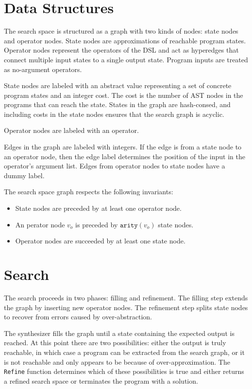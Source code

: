 \documentclass{article}
\begin{document}
\section{Data Structures}

The search space is structured as a graph with two kinds of nodes: state nodes
and operator nodes. State nodes are approximations of reachable program states.
Operator nodes represent the operators of the DSL and act as hyperedges that
connect multiple input states to a single output state. Program inputs are
treated as no-argument operators.

State nodes are labeled with an abstract value representing a set of concrete
program states and an integer cost. The cost is the number of AST nodes in the
programs that can reach the state. States in the graph are hash-consed, and
including costs in the state nodes ensures that the search graph is acyclic.

Operator nodes are labeled with an operator.

Edges in the graph are labeled with integers. If the edge is from a state node
to an operator node, then the edge label determines the position of the input in
the operator's argument list. Edges from operator nodes to state nodes have a
dummy label.

The search space graph respects the following invariants:
\begin{itemize}
\item State nodes are preceded by at least one operator node.
\item An perator node $v_o$ is preceded by $\texttt{arity}(v_o)$ state nodes.
\item Operator nodes are succeeded by at least one state node.
\end{itemize}

\section{Search}

The search proceeds in two phases: filling and refinement. The filling step
extends the graph by inserting new operator nodes. The refinement step splits
state nodes to recover from errors caused by over-abstraction.

The synthesizer fills the graph until a state containing the expected output is
reached. At this point there are two possibilities: either the output is truly
reachable, in which case a program can be extracted from the search graph, or it
is not reachable and only appears to be because of over-approximation. The
\texttt{Refine} function determines which of these possibilities is true and
either returns a refined search space or terminates the program with a solution.
\end{document}
